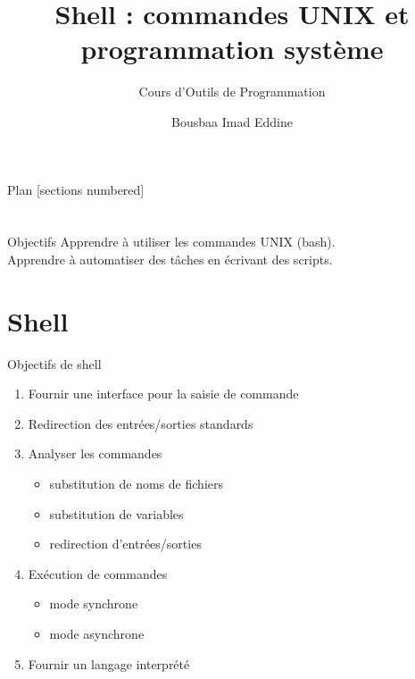\documentclass[10pt]{beamer}
\title{Shell : commandes UNIX et programmation système}
\subtitle{Cours d'Outils de Programmation}
\date{}
\author{Bousbaa Imad Eddine}
\institute{Université des Sciences et de la Technologie de Houari Boumediène}
\begin{document}
\maketitle

\begin{frame}{Plan}
  [sections numbered]
  \tableofcontents[hideallsubsections]
\end{frame}

\section{}

\begin{frame}[fragile]{Objectifs}
Apprendre à utiliser les commandes UNIX (bash).\\
Apprendre à automatiser des tâches en écrivant des scripts.\\

\end{frame}

\section{Shell}

\begin{frame}{Objectifs de shell}
\begin{enumerate}
\item Fournir une interface pour la saisie de commande
\item Redirection des entrées/sorties standards
\item Analyser les commandes
\begin{itemize}
	\item substitution de noms de fichiers
	\item substitution de variables
	\item redirection d’entrées/sorties
\end{itemize}
\item Exécution de commandes
\begin{itemize}
\item mode synchrone
\item mode asynchrone
\end{itemize}
\item Fournir un langage interprété
\end{enumerate}
\end{frame}
\end{document}
